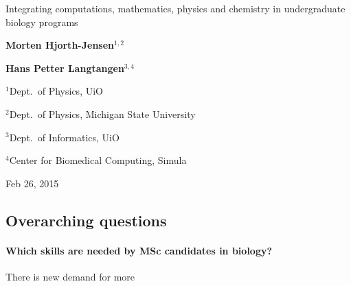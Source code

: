\documentclass[%
twoside,                 %
final,                   %
10pt]{article}
\begin{document}






\thispagestyle{empty}

\begin{center}
{\LARGE\bf
\begin{spacing}{1.25}
Integrating computations, mathematics, physics and chemistry in undergraduate biology programs
\end{spacing}
}
\end{center}


\begin{center}
{\bf Morten Hjorth-Jensen${}^{1, 2}$} \\ [0mm]
\end{center}

    
\begin{center}
{\bf Hans Petter Langtangen${}^{3, 4}$} \\ [0mm]
\end{center}

    \begin{center}
\centerline{{\small ${}^1$Dept.~of Physics, UiO}}
\centerline{{\small ${}^2$Dept.~of Physics, Michigan State University}}
\centerline{{\small ${}^3$Dept.~of Informatics, UiO}}
\centerline{{\small ${}^4$Center for Biomedical Computing, Simula}}
\end{center}
    

\begin{center} %
Feb 26, 2015
\end{center}

\vspace{1cm}


\subsection{Overarching questions}


\paragraph{Which skills are needed by MSc candidates in biology?}
There is new demand for more
\end{document}
